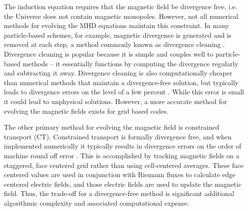 \documentclass[modern, linenumbers]{aastex631}
\begin{document}
The induction equation requires that the magnetic field be divergence free, i.e. the Universe does not contain magnetic monopoles. However, not all numerical methods for evolving the MHD equations maintain this constraint. In many particle-based schemes, for example, magnetic divergence is generated and is removed at each step, a method commonly known as divergence cleaning \citep{dedner_hyperbolic_2002}. Divergence cleaning is popular because it is simple and couples well to particle-based methods -- it essentially functions by computing the divergence regularly and subtracting it away. Divergence cleaning is also computationally cheaper than numerical methods that maintain a divergence-free solution, but typically leads to divergence errors on the level of a few percent \citep{dedner_hyperbolic_2002, pakmor_magnetizing_2020, van_de_voort_effect_2021}. While this error is small it could lead to unphysical solutions. However, a more accurate method for evolving the magnetic fields exists for grid based codes.

The other primary method for evolving the magnetic field is constrained transport (CT). Constrained transport is formally divergence free, and when implemented numerically it typically results in divergence errors on the order of machine round off error \citep{evans_1988, gardiner_2005, stone_athena_2008, stone_2009, zingale_castro_2020, almgren_castro_2020}. This is accomplished by tracking magnetic fields on a staggered, face centered grid rather than using cell-centered averages. These face centered values are used in conjunction with Riemann fluxes to calculate edge centered electric fields, and those electric fields are used to update the magnetic field. Thus, the trade-off for a divergence-free method is significant additional algorithmic complexity and associated computational expense.
\end{document}
